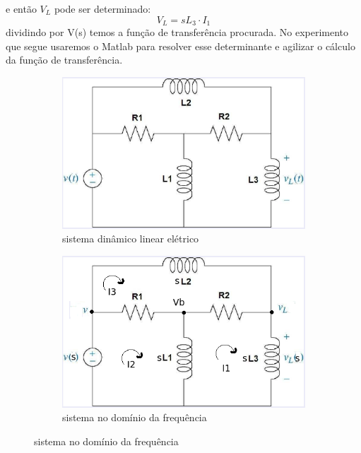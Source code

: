 \documentclass[a4paper,11pt]{article}
\begin{document}
 e então $V_L$ pode ser determinado:
 \begin{equation}
    V_L = sL_3 \cdot I_1
    \label{eq:VL}
 \end{equation}
 dividindo por V(s) temos a função de transferência procurada. 
 No experimento que segue usaremos o Matlab para resolver
 esse determinante e agilizar o cálculo da função de transferência.
 \FloatBarrier
\begin{figure}[!htp]
  \begin{subfigure}[!htp]{0.5\textwidth}
		\includegraphics[scale = 0.5]{./images/circuit1.png}
		\caption{sistema dinâmico linear elétrico}
		\label{fig:circuit1}
	\end{subfigure}
	\hspace{1 cm}
  \begin{subfigure}[!htp]{0.5\textwidth}
		\includegraphics[scale = 0.5]{./images/circuit1-freq.png}
		\caption{sistema no domínio da frequência}
		\label{fig:circuit1-freq}
	\end{subfigure}
\end{figure}
\FloatBarrier
 
\end{document}
